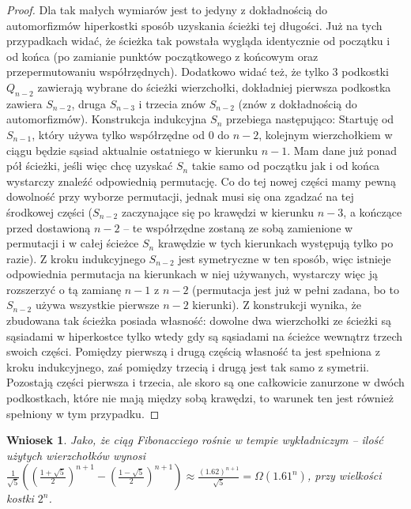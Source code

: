 \documentclass{pracamgr}
\newtheorem{corollary}[theorem]{Wniosek}
\begin{document}
\begin{proof}
     Dla tak małych wymiarów jest to jedyny z dokładnością do automorfizmów hiperkostki sposób uzyskania ścieżki tej długości.
     Już na tych przypadkach widać, że ścieżka tak powstała wygląda identycznie od początku i od końca
     (po zamianie punktów początkowego z końcowym oraz przepermutowaniu współrzędnych). Dodatkowo widać też,
     że tylko 3 podkostki $Q_{n-2}$ zawierają wybrane do ścieżki wierzchołki, dokładniej pierwsza podkostka zawiera $S_{n-2}$, druga $S_{n-3}$
     i trzecia znów $S_{n-2}$ (znów z dokładnością do automorfizmów).\newline
     Konstrukcja indukcyjna $S_n$ przebiega następująco:\newline
     Startuję od $S_{n-1}$, który używa tylko współrzędne od $0$ do $n-2$, kolejnym wierzchołkiem w ciągu będzie sąsiad aktualnie ostatniego w kierunku
     $n-1$. Mam dane już ponad pół ścieżki, jeśli więc chcę uzyskać $S_n$ takie samo od początku jak i od końca wystarczy znaleźć odpowiednią permutację.
     Co do tej nowej części mamy pewną dowolność przy wyborze permutacji, jednak musi się ona zgadzać na tej środkowej części
     ($S_{n-2}$ zaczynające się po krawędzi w kierunku $n-3$, a kończące przed dostawioną $n-2$ -- te współrzędne zostaną ze sobą zamienione w permutacji
     i w całej ścieżce $S_n$ krawędzie w tych kierunkach występują tylko po razie). Z kroku indukcyjnego $S_{n-2}$ jest symetryczne w ten sposób,
     więc istnieje odpowiednia permutacja na kierunkach w niej używanych, wystarczy więc ją rozszerzyć o tą zamianę $n-1$ z $n-2$
     (permutacja jest już w pełni zadana, bo to $S_{n-2}$ używa wszystkie pierwsze $n-2$ kierunki).
     Z konstrukcji wynika, że zbudowana tak ścieżka posiada własność: dowolne dwa wierzchołki ze ścieżki są sąsiadami w hiperkostce
     tylko wtedy gdy są sąsiadami na ścieżce wewnątrz trzech swoich części. Pomiędzy pierwszą i drugą częścią własność ta jest spełniona z kroku indukcyjnego,
     zaś pomiędzy trzecią i drugą jest tak samo z symetrii. Pozostają części pierwsza i trzecia, ale skoro są one całkowicie zanurzone w dwóch podkostkach,
     które nie mają między sobą krawędzi, to warunek ten jest również spełniony w tym przypadku.
    \end{proof}
    \begin{corollary}\label{fibo -> wykladniczy}
     Jako, że ciąg Fibonacciego rośnie w tempie wykładniczym -- ilość użytych wierzchołków wynosi
     $\frac{1}{\sqrt{5}}((\frac{1+\sqrt{5}}{2})^{n+1}-(\frac{1-\sqrt{5}}{2})^{n+1})\approx \frac{(1.62)^{n+1}}{\sqrt{5}}=\Omega(1.61^n)$, przy wielkości kostki $2^n$.
    \end{corollary}
\end{document}
